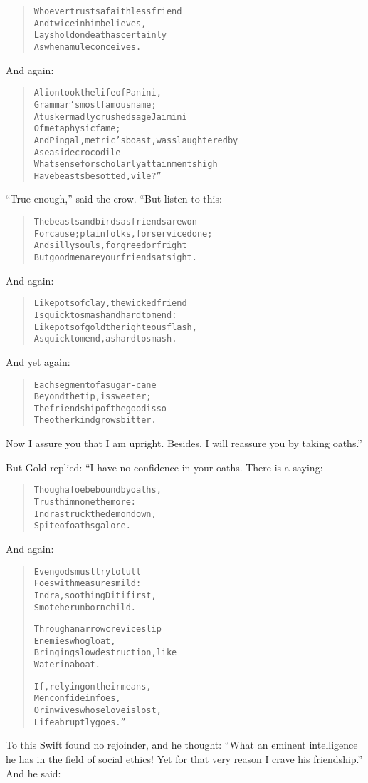\documentclass[article, twoside, 14pt]{memoir}
\renewenvironment{verbatim}{%
\begin{quote}%
\vskip -10pt%
\begin{alltt}\normalfont\large}{\end{alltt}%
\end{quote}%
\vskip -10pt
} %
\begin{document}
\begin{verbatim}
Whoever trusts a faithless friend
    And twice in him believes,
Lays hold on death as certainly
    As when a mule conceives.
\end{verbatim}
And again:

\begin{verbatim}
A lion took the life of Panini,
    Grammar's most famous name;
A tusker madly crushed sage Jaimini
    Of metaphysic fame;
And Pingal, metric's boast, was slaughtered by
    A seaside crocodile{\textemdash}
What sense for scholarly attainments high
    Have beasts besotted, vile?”
\end{verbatim}
``True enough,'' said the crow. “But listen to this:

\begin{verbatim}
The beasts and birds as friends are won
For cause; plain folks, for service done;
And silly souls, for greed or fright{\textemdash}
But good men are your friends at sight.
\end{verbatim}
And again:

\begin{verbatim}
Like pots of clay, the wicked friend
Is quick to smash and hard to mend:
Like pots of gold the righteous flash,
As quick to mend, as hard to smash.
\end{verbatim}
And yet again:

\begin{verbatim}
Each segment of a sugar-cane
    Beyond the tip, is sweeter;
The friendship of the good is so{\textemdash}
    The other kind grows bitter.
\end{verbatim}
Now I assure you that I am upright. Besides, I will reassure you by
taking oaths.”

But Gold replied: “I have no confidence in your oaths. There is a
saying:

\begin{verbatim}
Though a foe be bound by oaths,
    Trust him none the more:
Indra struck the demon down,
    Spite of oaths galore.
\end{verbatim}
And again:

\begin{verbatim}
Even gods must try to lull
    Foes with measures mild:
Indra, soothing Diti first,
    Smote her unborn child.

Through a narrow crevice slip
    Enemies who gloat,
Bringing slow destruction, like
    Water in a boat.

If, relying on their means,
    Men confide in foes,
Or in wives whose love is lost,
    Life abruptly goes.”
\end{verbatim}
To this Swift found no rejoinder, and he thought:
``What an eminent intelligence he has in the field of social ethics! Yet for that very reason I crave his friendship.''
And he said:
\end{document}
